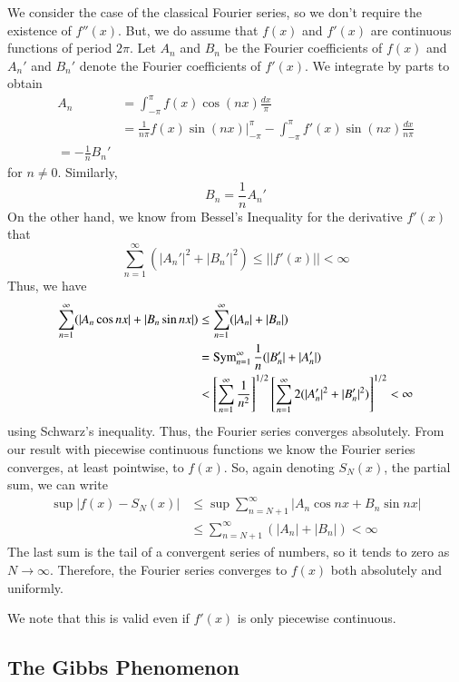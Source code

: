 We consider the case of the classical Fourier series, so we don't require the existence of $f''(x)$. But, we do assume that $f(x)$ and $f'(x)$ are continuous functions of period $2\pi$. Let $A_n$ and $B_n$ be the Fourier coefficients of $f(x)$ and $A_n'$ and $B_n'$ denote the Fourier coefficients of $f'(x)$. We integrate by parts to obtain \begin{align*}
    A_n &= \int_{-\pi}^{\pi}f(x)\cos(nx)\frac{dx}{\pi} \\
    &= \frac{1}{n\pi}f(x)\sin(nx)\Bigg\rvert_{-\pi}^{\pi} - \int_{-\pi}^{\pi}f'(x)\sin(nx)\frac{dx}{n\pi} \\
    = - \frac{1}{n}B_n'
\end{align*}
for $n \neq 0$. Similarly, \begin{equation*}
    B_n = \frac{1}{n}A_n'
\end{equation*}
On the other hand, we know from Bessel's Inequality for the derivative $f'(x)$ that \begin{equation*}
    \sum_{n=1}^{\infty}(|A_n'|^2+|B_n'|^2) \leq ||f'(x)|| < \infty
\end{equation*}
Thus, we have \begin{align*}
    \sum_{n=1}^{\infty}(|A_n\cos nx| + |B_n\sin nx|) &\leq \sum_{n=1}^{\infty}(|A_n|+|B_n|) \\
    &= \operatorname{Sym}_{n=1}^{\infty}\frac{1}{n}(|B_n'|+|A_n'|) \\
    &< \left[\sum_{n=1}^{\infty}\frac{1}{n^2}\right]^{1/2}\left[\sum_{n=1}^{\infty}2(|A_n'|^2+|B_n'|^2)\right]^{1/2} < \infty
\end{align*}
using Schwarz's inequality. Thus, the Fourier series converges absolutely. From our result with piecewise continuous functions we know the Fourier series converges, at least pointwise, to $f(x)$. So, again denoting $S_N(x)$, the partial sum, we can write \begin{align*}
    \sup|f(x) - S_N(x)| &\leq \sup\sum_{n=N+1}^{\infty}|A_n\cos nx+B_n\sin nx| \\
    &\leq \sum_{n=N+1}^{\infty}(|A_n|+|B_n|) < \infty
\end{align*}
The last sum is the tail of a convergent series of numbers, so it tends to zero as $N\rightarrow \infty$. Therefore, the Fourier series converges to $f(x)$ both absolutely and uniformly. 

We note that this is valid even if $f'(x)$ is only piecewise continuous.

\subsection{The Gibbs Phenomenon}

